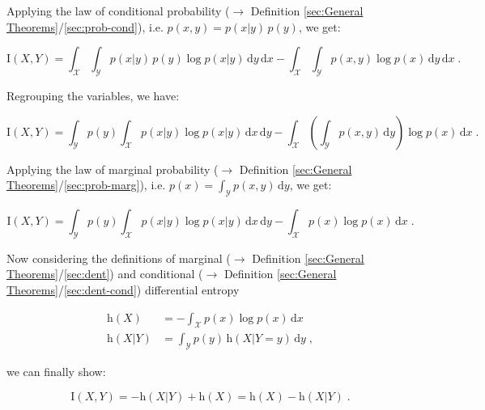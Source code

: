 \documentclass[a4paper,12pt,twoside]{book}
\begin{document}
Applying the law of conditional probability ($\rightarrow$ Definition \ref{sec:General Theorems}/\ref{sec:prob-cond}), i.e. $p(x,y) = p(x \vert y) \, p(y)$, we get:

\begin{equation} \label{eq:cmi-mcde-MI-s2}
\mathrm{I}(X,Y) = \int_{\mathcal{X}} \int_{\mathcal{Y}} p(x|y) \, p(y) \log p(x|y) \, \mathrm{d}y \, \mathrm{d}x - \int_{\mathcal{X}} \int_{\mathcal{Y}} p(x,y) \log p(x) \, \mathrm{d}y \, \mathrm{d}x \; .
\end{equation}

Regrouping the variables, we have:

\begin{equation} \label{eq:cmi-mcde-MI-s3}
\mathrm{I}(X,Y) = \int_{\mathcal{Y}} p(y) \int_{\mathcal{X}} p(x|y) \log p(x|y) \, \mathrm{d}x \, \mathrm{d}y - \int_{\mathcal{X}} \left( \int_{\mathcal{Y}} p(x,y) \, \mathrm{d}y \right) \log p(x)\, \mathrm{d}x \; .
\end{equation}

Applying the law of marginal probability ($\rightarrow$ Definition \ref{sec:General Theorems}/\ref{sec:prob-marg}), i.e. $p(x) = \int_{\mathcal{Y}} p(x,y) \, \mathrm{d}y$, we get:

\begin{equation} \label{eq:cmi-mcde-MI-s4}
\mathrm{I}(X,Y) = \int_{\mathcal{Y}} p(y) \int_{\mathcal{X}} p(x|y) \log p(x|y) \, \mathrm{d}x \, \mathrm{d}y - \int_{\mathcal{X}} p(x) \log p(x) \, \mathrm{d}x \; .
\end{equation}

Now considering the definitions of marginal ($\rightarrow$ Definition \ref{sec:General Theorems}/\ref{sec:dent}) and conditional ($\rightarrow$ Definition \ref{sec:General Theorems}/\ref{sec:dent-cond}) differential entropy

\begin{equation} \label{eq:cmi-mcde-MDE-CDE}
\begin{split}
\mathrm{h}(X) &= - \int_{\mathcal{X}} p(x) \log p(x) \, \mathrm{d}x \\
\mathrm{h}(X|Y) &= \int_{\mathcal{Y}} p(y) \, \mathrm{h}(X|Y=y) \, \mathrm{d}y \; ,
\end{split}
\end{equation}

we can finally show:

\begin{equation} \label{eq:cmi-mcde-MI-qed}
\mathrm{I}(X,Y) = - \mathrm{h}(X|Y) + \mathrm{h}(X) = \mathrm{h}(X) - \mathrm{h}(X|Y) \; .
\end{equation}
\end{document}
